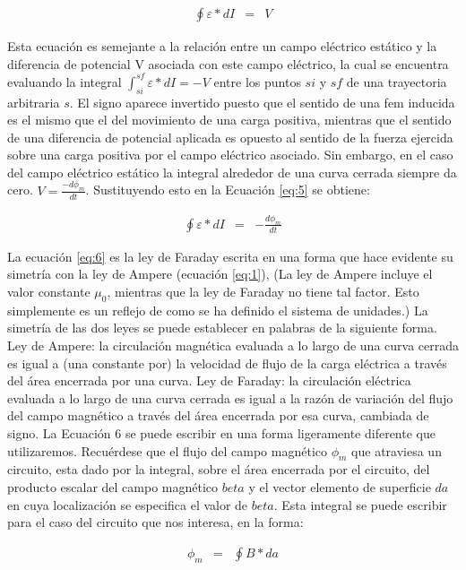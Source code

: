 \documentclass[11pt]{article}
\begin{document}
\begin{multicols}{2}
		\begin{eqnarray}
			\oint \varepsilon *dI &=& V \label{eq:5}
		\end{eqnarray}

		Esta ecuación es semejante a la relación entre un campo eléctrico estático y la diferencia de potencial V asociada con este campo eléctrico, la cual se encuentra evaluando la integral $\int_{si}^{sf}{\varepsilon * d I=-V}$ entre los puntos $si$ y $sf$ de una trayectoria arbitraria $s$. El signo aparece invertido puesto que el sentido de una fem inducida es el mismo que el del movimiento de una carga positiva, mientras que el sentido de una diferencia de potencial aplicada es opuesto al sentido de la fuerza ejercida sobre una carga positiva por el campo eléctrico asociado. Sin embargo, en el caso del campo eléctrico estático la integral alrededor de una curva cerrada siempre da cero.
		$V=\frac{-d \phi _m}{dt}$. Sustituyendo esto en la Ecuación \ref{eq:5} se obtiene:
		
		\begin{eqnarray}
			\oint \varepsilon *dI &=& -\frac{d\phi _m}{dt} \label{eq:6}
		\end{eqnarray}

		La ecuación \ref{eq:6} es la ley de Faraday escrita en una forma que hace evidente su simetría con la ley de Ampere (ecuación \ref{eq:1}), (La ley de Ampere incluye el valor constante $\mu  _0$, mientras que la ley de Faraday no tiene tal factor. Esto simplemente es un reflejo de como se ha definido el sistema de unidades.) La simetría de las dos leyes se puede establecer en palabras de la siguiente forma.
		Ley de Ampere: la circulación magnética evaluada a lo largo de una curva cerrada es igual a (una constante por) la velocidad de flujo de la carga eléctrica a través del área encerrada por una curva.
		Ley de Faraday: la circulación eléctrica evaluada a lo largo de una curva cerrada es igual a la razón de variación del flujo del campo magnético a través del área encerrada por esa curva, cambiada de signo.
		La Ecuación 6 se puede escribir en una forma ligeramente diferente que utilizaremos. Recuérdese que el flujo del campo magnético $\phi _m$ que atraviesa un circuito, esta dado por la integral, sobre el área encerrada por el circuito, del producto escalar del campo magnético $beta$ y el vector elemento de superficie $da$ en cuya localización se especifica el valor de $beta$. Esta integral se puede escribir para el caso del circuito que nos interesa, en la forma:
		
		\begin{eqnarray}
			\phi _m &=& \oint B*da\label{eq:7}
		\end{eqnarray}



\end{multicols}
\end{document}
